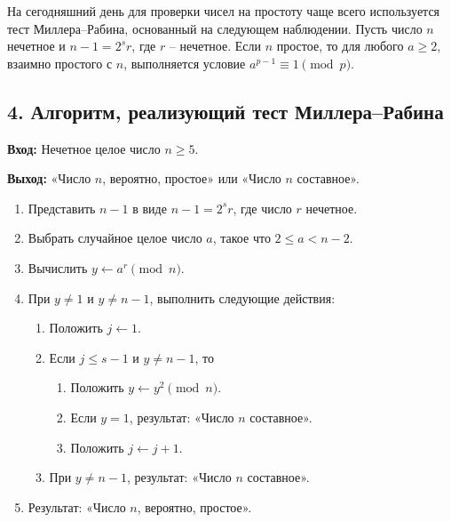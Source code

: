 \documentclass{article}
\begin{document}
На сегодняшний день для проверки чисел на простоту чаще всего используется тест Миллера–Рабина, основанный на следующем наблюдении. Пусть число \( n \) нечетное и \( n - 1 = 2^s r \), где \( r \) – нечетное. Если \( n \) простое, то для любого \( a \geq 2 \), взаимно простого с \( n \), выполняется условие \( a^{p-1} \equiv 1 \pmod{p} \).

\subsection*{4. Алгоритм, реализующий тест Миллера–Рабина}

\textbf{Вход:} Нечетное целое число \( n \geq 5 \).

\textbf{Выход:} «Число \( n \), вероятно, простое» или «Число \( n \) составное».

\begin{enumerate}
    \item Представить \( n - 1 \) в виде \( n - 1 = 2^s r \), где число \( r \) нечетное.
    \item Выбрать случайное целое число \( a \), такое что \( 2 \leq a < n - 2 \).
    \item Вычислить \( y \gets a^r \pmod{n} \).
    \item При \( y \neq 1 \) и \( y \neq n - 1 \), выполнить следующие действия:
    \begin{enumerate}
        \item Положить \( j \gets 1 \).
        \item Если \( j \leq s - 1 \) и \( y \neq n - 1 \), то
        \begin{enumerate}
            \item Положить \( y \gets y^2 \pmod{n} \).
            \item Если \( y = 1 \), результат: «Число \( n \) составное».
            \item Положить \( j \gets j + 1 \).
        \end{enumerate}
        \item При \( y \neq n - 1 \), результат: «Число \( n \) составное».
    \end{enumerate}
    \item Результат: «Число \( n \), вероятно, простое».
\end{enumerate}
\end{document}
